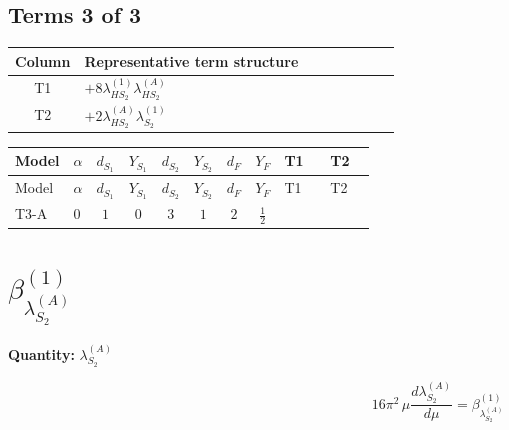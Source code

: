 \documentclass[8pt]{article}
\begin{document}
\begin{landscape}
\subsection*{Terms 3 of 3}
\begin{center}
\begin{tabular}{@{}c >{\raggedright\arraybackslash}p{0.82\linewidth}@{}}
\toprule
Column & Representative term structure \\
\midrule
T1 & \(\displaystyle +8 {\lambda_{HS_2}^{(1)}} {\lambda_{HS_2}^{(A)}}\) \\
\midrule
T2 & \(\displaystyle +2 {\lambda_{HS_2}^{(A)}} {\lambda_{S_2}^{(1)}}\) \\
\midrule
\bottomrule
\end{tabular}
\end{center}
\smallskip
\tiny
\begin{longtable}{@{}llcccccc >{\raggedright\arraybackslash}p{0.21\linewidth} >{\raggedright\arraybackslash}p{0.21\linewidth}@{}}
\toprule
Model & $\alpha$ & $d_{S_1}$ & $Y_{S_1}$ & $d_{S_2}$ & $Y_{S_2}$ & $d_F$ & $Y_F$ & T1 & T2 \\
\midrule
\endfirsthead
\toprule
Model & $\alpha$ & $d_{S_1}$ & $Y_{S_1}$ & $d_{S_2}$ & $Y_{S_2}$ & $d_F$ & $Y_F$ & T1 & T2 \\
\midrule
\endhead
T3-A & $0$ & $1$ & $0$ & $3$ & $1$ & $2$ & $\frac{1}{2}$ & \scriptsize\adjustbox{max width=\linewidth}{$\begin{gathered} +8 {\lambda_{HS_2}^{(1)}} {\lambda_{HS_2}^{(A)}}\end{gathered}$} & \scriptsize\adjustbox{max width=\linewidth}{$\begin{gathered} +2 {\lambda_{HS_2}^{(A)}} {\lambda_{S_2}^{(1)}}\end{gathered}$} \\
\midrule
\bottomrule
\end{longtable}
\clearpage
\section*{$\beta_{\lambda_{S_2}^{(A)}}^{(1)}$}
\noindent\textbf{Quantity: }$\lambda_{S_2}^{(A)}$\par\smallskip
\[16\pi^2\,\mu\frac{d \lambda_{S_2}^{(A)}}{d\mu}=\beta_{\lambda_{S_2}^{(A)}}^{(1)}\]

\end{landscape}
\end{document}
